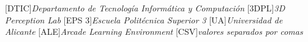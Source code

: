 [DTIC]{\emph{Departamento de Tecnología Informática y Computación}}
[3DPL]{\emph{3D Perception Lab}}
[EPS 3]{\emph{Escuela Politécnica Superior 3}}
[UA]{\emph{Universidad de Alicante}}
[ALE]{\emph{Arcade Learning Environment}}
[CSV]{\emph{valores separados por comas}}

